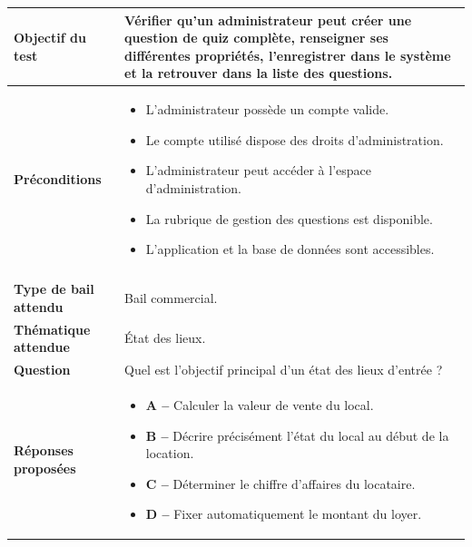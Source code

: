 \begin{longtable}{
    |>{\raggedright\arraybackslash}p{}
    |>{\raggedright\arraybackslash}p{}|
}
\textbf{Objectif du test}
&
Vérifier qu'un administrateur peut créer une question de quiz complète,
renseigner ses différentes propriétés, l'enregistrer dans le système et la
retrouver dans la liste des questions.
\\
\hline


\textbf{Préconditions}
&
\begin{itemize}[leftmargin=*,nosep]
    \item L'administrateur possède un compte valide.
    \item Le compte utilisé dispose des droits d'administration.
    \item L'administrateur peut accéder à l'espace d'administration.
    \item La rubrique de gestion des questions est disponible.
    \item L'application et la base de données sont accessibles.
\end{itemize}
\\
\hline


\rowcolor{orange!15}
\multicolumn{2}{|c|}{
    \textbf{Données utilisées pour le test}
}
\\
\hline

\textbf{Type de bail attendu}
&
Bail commercial.
\\
\hline

\textbf{Thématique attendue}
&
État des lieux.
\\
\hline

\textbf{Question}
&
Quel est l'objectif principal d'un état des lieux d'entrée ?
\\
\hline

\textbf{Réponses proposées}
&
\begin{itemize}[leftmargin=*,nosep]
    \item \textbf{A --} Calculer la valeur de vente du local.
    \item \textbf{B --} Décrire précisément l'état du local au début de la location.
    \item \textbf{C --} Déterminer le chiffre d'affaires du locataire.
    \item \textbf{D --} Fixer automatiquement le montant du loyer.
\end{itemize}
\\
\hline


\end{longtable}
